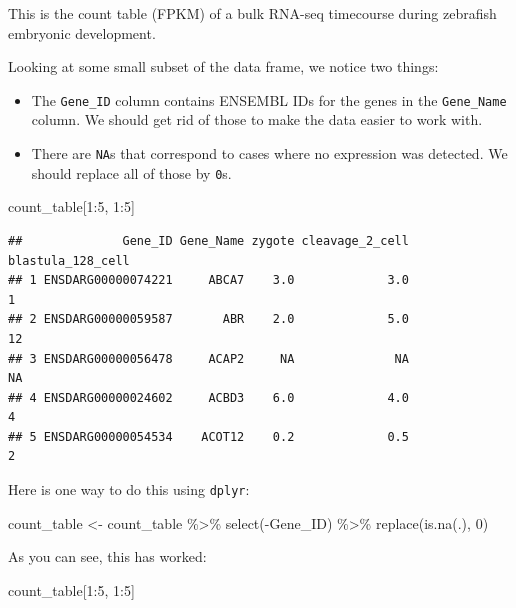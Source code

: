 \documentclass[
]{article}
\newenvironment{Shaded}{\begin{snugshade}}{\end{snugshade}}
\newcommand{\DecValTok}[1]{\textcolor[rgb]{0.00,0.00,0.81}{#1}}
\newcommand{\FunctionTok}[1]{\textcolor[rgb]{0.00,0.00,0.00}{#1}}
\newcommand{\NormalTok}[1]{#1}
\newcommand{\OtherTok}[1]{\textcolor[rgb]{0.56,0.35,0.01}{#1}}
\newcommand{\SpecialCharTok}[1]{\textcolor[rgb]{0.00,0.00,0.00}{#1}}
\begin{document}
This is the count table (FPKM) of a bulk RNA-seq timecourse during
zebrafish embryonic development.

Looking at some small subset of the data frame, we notice two things:

\begin{itemize}
\item
  The \texttt{Gene\_ID} column contains ENSEMBL IDs for the genes in the
  \texttt{Gene\_Name} column. We should get rid of those to make the
  data easier to work with.
\item
  There are \texttt{NA}s that correspond to cases where no expression
  was detected. We should replace all of those by \texttt{0}s.
\end{itemize}

\begin{Shaded}
\begin{Highlighting}[]
\NormalTok{count\_table[}\DecValTok{1}\SpecialCharTok{:}\DecValTok{5}\NormalTok{, }\DecValTok{1}\SpecialCharTok{:}\DecValTok{5}\NormalTok{]}
\end{Highlighting}
\end{Shaded}

\begin{verbatim}
##              Gene_ID Gene_Name zygote cleavage_2_cell blastula_128_cell
## 1 ENSDARG00000074221     ABCA7    3.0             3.0                 1
## 2 ENSDARG00000059587       ABR    2.0             5.0                12
## 3 ENSDARG00000056478     ACAP2     NA              NA                NA
## 4 ENSDARG00000024602     ACBD3    6.0             4.0                 4
## 5 ENSDARG00000054534    ACOT12    0.2             0.5                 2
\end{verbatim}

Here is one way to do this using \texttt{dplyr}:

\begin{Shaded}
\begin{Highlighting}[]
\NormalTok{count\_table }\OtherTok{\textless{}{-}}\NormalTok{ count\_table }\SpecialCharTok{\%\textgreater{}\%} 
  \FunctionTok{select}\NormalTok{(}\SpecialCharTok{{-}}\NormalTok{Gene\_ID) }\SpecialCharTok{\%\textgreater{}\%} 
  \FunctionTok{replace}\NormalTok{(}\FunctionTok{is.na}\NormalTok{(.), }\DecValTok{0}\NormalTok{)}
\end{Highlighting}
\end{Shaded}

As you can see, this has worked:

\begin{Shaded}
\begin{Highlighting}[]
\NormalTok{count\_table[}\DecValTok{1}\SpecialCharTok{:}\DecValTok{5}\NormalTok{, }\DecValTok{1}\SpecialCharTok{:}\DecValTok{5}\NormalTok{]}
\end{Highlighting}
\end{Shaded}
\end{document}
